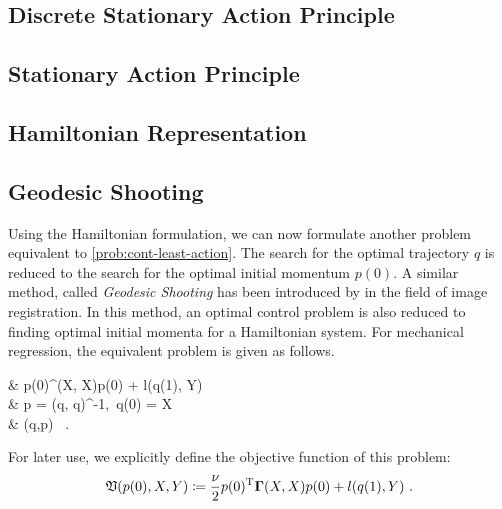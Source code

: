 \subsection{Discrete Stationary Action Principle}



\subsection{Stationary Action Principle}



\subsection{Hamiltonian Representation}



\subsection{Geodesic Shooting}

Using the Hamiltonian formulation, we can now formulate another problem equivalent to \cref{prob:cont-least-action}.
The search for the optimal trajectory $q$ is reduced to the search for the optimal initial momentum $p(0)$.
A similar method, called \emph{Geodesic Shooting} has been introduced by \citet{allassonniere05} in the field of image registration.
In this method, an optimal control problem is also reduced to finding optimal initial momenta for a Hamiltonian system.
For mechanical regression, the equivalent problem is given as follows.
\begin{problem}
	\label{prob:geodesic-shooting}
	\begin{cases}
		&  p(0)^\T \bGamma(X, X)p(0) + l(q(1), Y)\\
		 & p = \bGamma(q, q)^{-1},\ q(0) = X \\
		& (q,p)  \ .
	\end{cases}
\end{problem}
For later use, we explicitly define the objective function of this problem:
\begin{equation}
\label{eq:geodesic-shooting-objective}
\mathfrak{V}(p(0), X, Y) \coloneqq \frac{\nu}{2} p(0)^{\mathrm{T}} \mathbf{\Gamma}(X, X)p(0) + l(q(1), Y) \ .
\end{equation}

